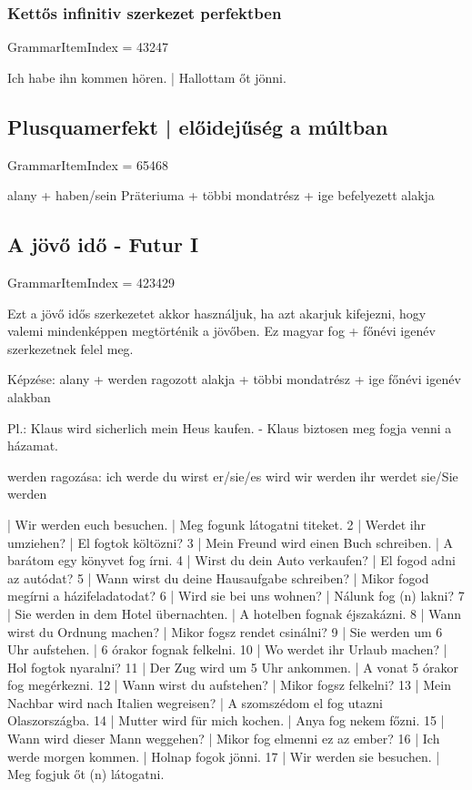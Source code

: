 \documentclass{article}
\newenvironment{desc}{\verbatim}{\endverbatim}
\newenvironment{exmp}{\verbatim}{\endverbatim}
\begin{document}
\subsubsection{Kettős infinitiv szerkezet perfektben}

GrammarItemIndex = 43247

\begin{desc}
Ich habe ihn kommen hören. | Hallottam őt jönni.
\end{desc}

\subsection{Plusquamerfekt | előidejűség a múltban}

GrammarItemIndex = 65468

\begin{desc}
alany + haben/sein Präteriuma + többi mondatrész + ige befelyezett alakja
\end{desc}


\subsection{A jövő idő - Futur I}

GrammarItemIndex = 423429

\begin{desc}
Ezt a jövő idős szerkezetet akkor használjuk, ha azt akarjuk kifejezni, hogy valemi mindenképpen megtörténik a jövőben. Ez magyar fog + főnévi igenév szerkezetnek felel meg.

Képzése: alany + werden ragozott alakja + többi mondatrész + ige főnévi igenév alakban

Pl.: Klaus wird sicherlich mein Heus kaufen. - Klaus biztosen meg fogja venni a házamat.

werden ragozása:
ich werde
du wirst
er/sie/es wird
wir werden
ihr werdet
sie/Sie werden
\end{desc}

\begin{exmp}
1 | Wir werden euch besuchen. | Meg fogunk látogatni titeket.
2 | Werdet ihr umziehen? | El fogtok költözni?
3 | Mein Freund wird einen Buch schreiben. | A barátom egy könyvet fog írni.
4 | Wirst du dein Auto verkaufen? | El fogod adni az autódat?
5 | Wann wirst du deine Hausaufgabe schreiben? | Mikor fogod megírni a házifeladatodat?
6 | Wird sie bei uns wohnen? | Nálunk fog (n) lakni?
7 | Sie werden in dem Hotel übernachten. | A hotelben fognak éjszakázni.
8 | Wann wirst du Ordnung machen? | Mikor fogsz rendet csinálni?
9 | Sie werden um 6 Uhr aufstehen. | 6 órakor fognak felkelni.
10 | Wo werdet ihr Urlaub machen? | Hol fogtok nyaralni?
11 | Der Zug wird um 5 Uhr ankommen. | A vonat 5 órakor fog megérkezni.
12 | Wann wirst du aufstehen? | Mikor fogsz felkelni?
13 | Mein Nachbar wird nach Italien wegreisen? | A szomszédom el fog utazni Olaszországba.
14 | Mutter wird für mich kochen. | Anya fog nekem főzni.
15 | Wann wird dieser Mann weggehen? | Mikor fog elmenni ez az ember?
16 | Ich werde morgen kommen. | Holnap fogok jönni.
17 | Wir werden sie besuchen. | Meg fogjuk őt (n) látogatni.
\end{exmp}
\end{document}
